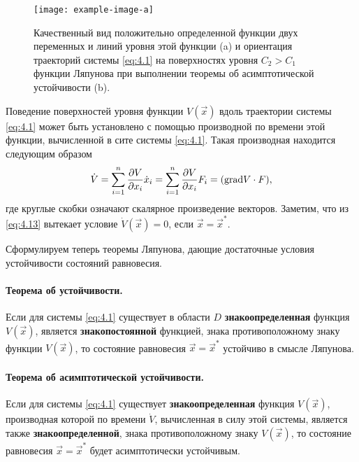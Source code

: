 \begin{figure}[h!]
        \centering
        \texttt{[image: example-image-a]}
        \caption{Качественный вид положительно определенной функции двух переменных и линий уровня этой функции (a) и ориентация траекторий системы \eqref{eq:4.1} на поверхностях уровня $C_2 >C_1$ функции Ляпунова при выполнении теоремы об асимптотической устойчивости (b).}
        \label{fig:4.1}
\end{figure}

Поведение поверхностей уровня функции $V(\vec x)$ вдоль траектории системы \eqref{eq:4.1} может быть установлено с помощью производной по времени этой функции, вычисленной в сите системы \eqref{eq:4.1}. Такая производная находится следующим образом
\begin{equation}
        \label{eq:4.13}
        \dot V = \sum\limits_{i=1}^{n}  \pdv{V}{x_i} \dot x_{i} = \sum\limits_{i=1}^{n} \pdv{V}{x_{i}} F_i = 
        \qty( \textrm{grad} V \cdot F),
\end{equation}
где круглые скобки означают скалярное произведение векторов. Заметим, что из \eqref{eq:4.13} вытекает условие $\dot V(\vec x)=0$, если $\vec x = \vec x^*$.

Сформулируем теперь теоремы Ляпунова, дающие достаточные условия устойчивости состояний равновесия.

\paragraph{Теорема об устойчивости.}%
\label{par:teorema_ob_ustoichivosti_}

Если для системы \eqref{eq:4.1} существует в области $D$
\textbf{знакоопределенная} функция $V(\vec x)$, является \textbf{знакопостоянной} 
функцией, знака противоположному знаку функции $V(\vec x)$, то состояние равновесия $\vec x = \vec x^*$ устойчиво в смысле Ляпунова.

\paragraph{Теорема об асимптотической устойчивости.}%
\label{par:teorema_ob_asimptoticheskoi_ustoichivosti}

Если для системы \eqref{eq:4.1} существует \textbf{знакоопределенная} функция $V(\vec x)$, производная которой по времени $\dot V$, вычисленная в силу этой системы, является также \textbf{ знакоопределенной}, знака противоположному знаку $V(\vec x)$, то состояние равновесия $\vec x= \vec x^*$ будет асимптотически устойчивым. 

